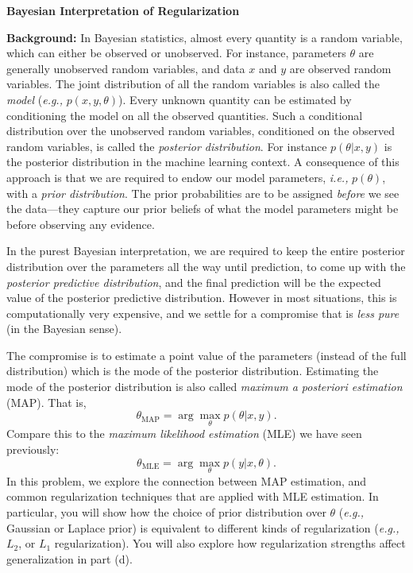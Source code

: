 \item {} {\bf Bayesian Interpretation of Regularization}


\textbf{Background: }
In Bayesian statistics, almost every quantity is a random variable, which
can either be observed or unobserved. For instance, parameters $\theta$ are
generally unobserved random variables, and data $x$ and $y$ are observed
random variables. The joint distribution of all the random variables is
also called the \emph{model} (\emph{e.g.,} $p(x, y, \theta)$). Every unknown quantity can
be estimated by conditioning the model on all the observed quantities. Such
a conditional distribution over the unobserved random variables, conditioned
on the observed random variables, is called the \emph{posterior distribution}.
For instance $p(\theta | x, y)$ is the posterior distribution in the
machine learning context. A consequence of this approach is that we are
required to endow our model parameters, \emph{i.e.,} $p(\theta)$, with a \emph{prior distribution}.
The prior probabilities are to be assigned \emph{before} we see the data---they capture our prior beliefs of what the model parameters might be
before observing any evidence.

In the purest Bayesian interpretation, we are required to keep the entire
posterior distribution over the parameters all the way until prediction, to
come up with the \emph{posterior predictive distribution}, and the final prediction
will be the expected value of the posterior predictive distribution. However
in most situations, this is computationally very expensive, and we settle for
a compromise that is \emph{less pure} (in the Bayesian sense).

The compromise is to estimate a point value of the parameters (instead of the
full distribution) which is the mode of the posterior distribution. Estimating
the mode of the posterior distribution is also called
\emph{maximum a posteriori estimation} (MAP). That is,
$$\theta_{\text{MAP}} = \arg\max_\theta p(\theta|x,y).$$
Compare this to the \emph{maximum likelihood estimation} (MLE) we have
seen previously:
$$\theta_{\text{MLE}} = \arg\max_\theta p(y|x,\theta).$$
In this problem, we explore the connection between MAP estimation, and common
regularization techniques that are applied with MLE estimation.
In particular, you will show how the choice of prior distribution over $\theta$ (\emph{e.g.,}
Gaussian or Laplace prior)
is equivalent to different kinds of regularization (\emph{e.g.,} $L_2$, or $L_1$
regularization). You will also explore how regularization strengths affect generalization in part (d).

